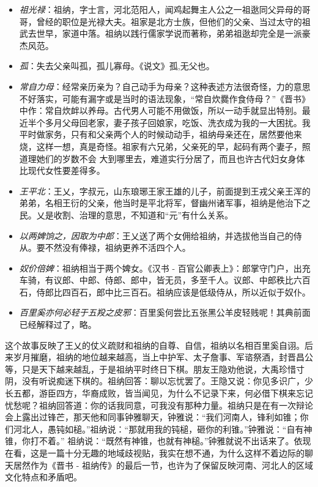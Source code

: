 \documentclass[]{book}
\providecommand{\tightlist}{%
  \setlength{\itemsep}{0pt}\setlength{\parskip}{0pt}}
\begin{document}
\begin{itemize}
\tightlist
\item
  \emph{祖光禄}：祖纳，字士言，河北范阳人，闻鸡起舞主人公之一祖逖同父异母的哥哥，曾经的职位是光禄大夫。祖家是北方士族，但他们的父亲、当过太守的祖武去世早，家道中落。祖纳以践行儒家学说而著称，弟弟祖逖却完全是一派豪杰风范。
\item
  \emph{孤}：失去父亲叫孤，孤儿寡母。《说文》孤,无父也。
\item
  \emph{常自力母}：经常亲历亲为？自己动手为母亲？这种表述方法很奇怪，力的意思不好落实，可能有漏字或是当时的语法现象，``常自炊爨作食侍母？''《晋书》中作：常自炊衅以养母。古代男人可能不用做饭，所以一动手就显出特别。最近半个多月父母回老家，妻子孩子回娘家，吃饭、洗衣成为我的一大困扰。我平时做家务，只有和父亲两个人的时候动动手，祖纳母亲还在，居然要他来烧，这样一想，真是奇怪。祖家有六兄弟，父亲死的早，起码有两个妻子，照道理她们的岁数不会
  大到哪里去，难道实行分居了，而且也许古代妇女身体比现代女性要差得多。
\item
  \emph{王平北}：王乂，字叔元，山东琅琊王家王雄的儿子，前面提到王戎父亲王浑的弟弟，名相王衍的父亲，他当时是平北将军，督幽州诸军事，祖纳是他治下之民。乂是收割、治理的意思，不知道和``元''有什么关系。
\item
  \emph{以两婢饷之，因取为中郎}：王乂送了两个女佣给祖纳，并选拔他当自己的侍从。要不然没有俸禄，祖纳更养不活四个人。
\item
  \emph{奴价倍婢}：祖纳相当于两个婢女。《汉书 -
  百官公卿表上》：郎掌守门户，出充车骑，有议郎、中郎、侍郎、郎中，皆无员，多至千人。议郎、中郎秩比六百石，侍郎比四百石，郎中比三百石。祖纳应该是低级侍从，所以近似于奴仆。
\item
  \emph{百里奚亦何必轻于五羖之皮邪}：百里奚何尝比五张黑公羊皮轻贱呢！其典前面已经解释过了，略。
\end{itemize}

这个故事反映了王乂的仗义疏财和祖纳的自尊、自信，祖纳以名相百里奚自诩。后来岁月摧磨，祖纳的地位越来越高，当上中护军、太子詹事、军谘祭酒，封晋昌公等，只是天下越来越乱，于是祖纳平时终日下棋。朋友王隐劝他说，大禹珍惜寸阴，没有听说痴迷下棋的。祖纳回答：聊以忘忧罢了。王隐又说：你见多识广，少长五都，游臣四方，华裔成败，皆当闻见，为什么不记录下来，何必借下棋来忘记忧愁呢？祖纳回答道：你的话我同意，可我没有那种力量。祖纳只是在有一次辩论
会上露出过锋芒，那天他和同事钟雅聊天，钟雅说：``我们河南人，锋利如锥；你们河北人，愚钝如槌。''祖纳说：``那就用我的钝槌，砸你的利锥。''钟雅说：``自有神锥，你打不着。''
祖纳说：``既然有神锥，也就有神槌。''钟雅就说不出话来了。依现在看，这是一篇十分无趣的地域歧视贴，我实在想不通，为什么这样不着边际的聊天居然作为《晋书
-
祖纳传》的最后一节，也许为了保留反映河南、河北人的区域文化特点和矛盾吧。
\end{document}
